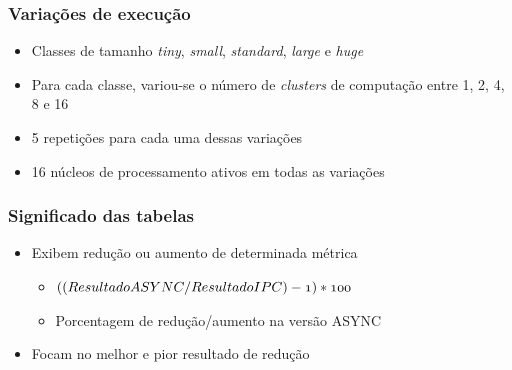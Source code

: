 \documentclass[xcolor={table}]{beamer}
\begin{document}
\begin{frame}\frametitle{Variações de execução}
    \begin{itemize}
        \item {Classes de tamanho \textit{tiny}, \textit{small}, \textit{standard}, \textit{large} e \textit{huge}}
        \item {Para cada classe, variou-se o número de \textit{clusters} de computação entre 1, 2, 4, 8 e 16}
        \item {5 repetições para cada uma dessas variações}
        \item {16 núcleos de processamento ativos em todas as variações}
    \end{itemize}
\end{frame}

\begin{frame}\frametitle{Significado das tabelas}
    \begin{itemize}
        \item {Exibem redução ou aumento de determinada métrica}
        \begin{itemize}
            \item {$\mathnormal{((Resultado ASYNC / Resultado IPC) - 1) * 100}$}
            \item {Porcentagem de redução/aumento na versão ASYNC}
        \end{itemize}
        \item {Focam no melhor e pior resultado de redução}
    \end{itemize}
\end{frame}
\end{document}

